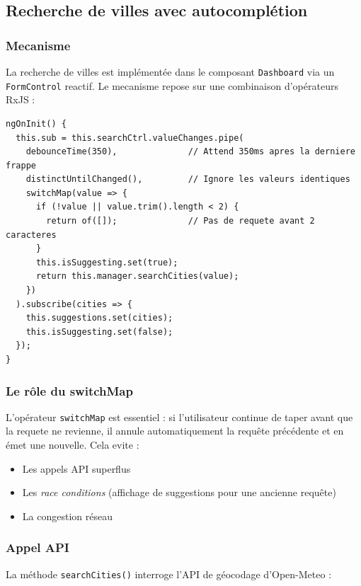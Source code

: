 \documentclass[12pt,a4paper]{article}
\begin{document}
\subsection{Recherche de villes avec autocomplétion}

\subsubsection{Mecanisme}

La recherche de villes est implémentée dans le composant \texttt{Dashboard} via un \texttt{FormControl} reactif. Le mecanisme repose sur une combinaison d'opérateurs RxJS :

\begin{lstlisting}[style=angular, caption={Autocompletion avec debounce et switchMap}]
ngOnInit() {
  this.sub = this.searchCtrl.valueChanges.pipe(
    debounceTime(350),              // Attend 350ms apres la derniere frappe
    distinctUntilChanged(),         // Ignore les valeurs identiques
    switchMap(value => {
      if (!value || value.trim().length < 2) {
        return of([]);              // Pas de requete avant 2 caracteres
      }
      this.isSuggesting.set(true);
      return this.manager.searchCities(value);
    })
  ).subscribe(cities => {
    this.suggestions.set(cities);
    this.isSuggesting.set(false);
  });
}
\end{lstlisting}

\subsubsection{Le rôle du switchMap}

L'opérateur \texttt{switchMap} est essentiel : si l'utilisateur continue de taper avant que la requete ne revienne, il annule automatiquement la requête précédente et en émet une nouvelle. Cela evite :
\begin{itemize}[nosep]
    \item Les appels API superflus
    \item Les \emph{race conditions} (affichage de suggestions pour une ancienne requête)
    \item La congestion réseau
\end{itemize}

\subsubsection{Appel API}

La méthode \texttt{searchCities()} interroge l'API de géocodage d'Open-Meteo :
\end{document}
